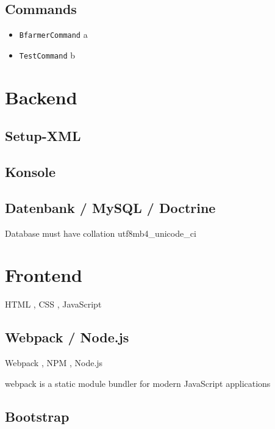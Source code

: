 \subsection{Commands}

\begin{itemize}
\item \texttt{BfarmerCommand} \newline a
\item \texttt{TestCommand} \newline b
\end{itemize}

\section{Backend}

\subsection{Setup-XML}

\subsection{Konsole}

\subsection{Datenbank / MySQL / Doctrine}

Database must have collation utf8mb4\_unicode\_ci

\section{Frontend}

HTML \cite{html}, CSS \cite{css}, JavaScript \cite{javascript}

\subsection{Webpack / Node.js}

Webpack \cite{webpack}, NPM \cite{npm}, Node.js \cite{nodejs}

webpack is a static module bundler for modern JavaScript applications

\subsection{Bootstrap}

